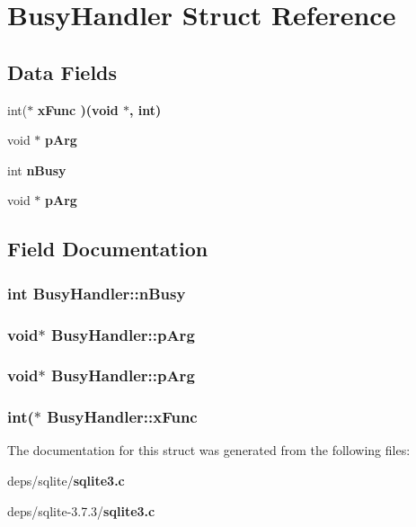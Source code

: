 \section{Busy\-Handler Struct Reference}
\label{structBusyHandler}
\subsection*{Data Fields}
\begin{CompactItemize}
\item 
int($\ast$ \bf{x\-Func} )(void $\ast$, int)
\item 
void $\ast$ \bf{p\-Arg}
\item 
int \bf{n\-Busy}
\item 
void $\ast$ \bf{p\-Arg}
\end{CompactItemize}


\subsection{Field Documentation}
\subsubsection{\setlength{\rightskip}{0pt plus 5cm}int \bf{Busy\-Handler::n\-Busy}}\label{structBusyHandler_d427404f79fb8dd562ba09805b5691f7}


\subsubsection{\setlength{\rightskip}{0pt plus 5cm}void$\ast$ \bf{Busy\-Handler::p\-Arg}}\label{structBusyHandler_a34bbfbc4257e321706c4911cb53a219}


\subsubsection{\setlength{\rightskip}{0pt plus 5cm}void$\ast$ \bf{Busy\-Handler::p\-Arg}}\label{structBusyHandler_a34bbfbc4257e321706c4911cb53a219}


\subsubsection{\setlength{\rightskip}{0pt plus 5cm}int($\ast$ \bf{Busy\-Handler::x\-Func}}\label{structBusyHandler_ffda37708fdb7a28c67b78533b16240b}




The documentation for this struct was generated from the following files:\begin{CompactItemize}
\item 
deps/sqlite/\bf{sqlite3.c}\item 
deps/sqlite-3.7.3/\bf{sqlite3.c}\end{CompactItemize}
